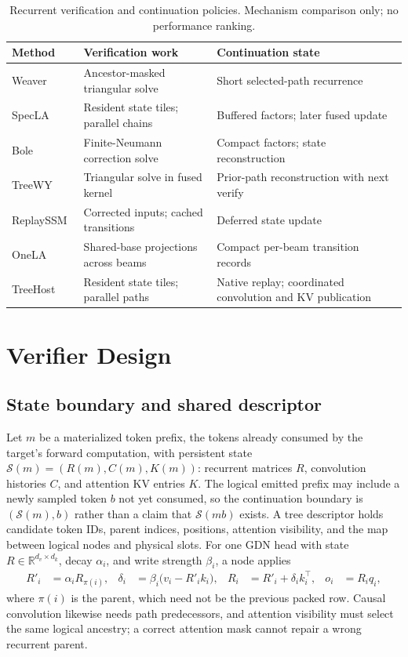 \documentclass[sigconf,anonymous,review]{acmart}
\newcommand{\sys}{TreeHost}
\begin{document}
\begin{table}[t]
\caption{Recurrent verification and continuation policies. Mechanism comparison only; no performance ranking.}
\label{tab:related}
\centering\footnotesize
\begin{tabularx}{\columnwidth}{@{}>{\raggedright\arraybackslash}p{}YY@{}}
\toprule
Method & Verification work & Continuation state \\
\midrule
Weaver~\cite{oda2026marginals} & Ancestor-masked triangular solve & Short selected-path recurrence \\
SpecLA~\cite{wang2026specla} & Resident state tiles; parallel chains & Buffered factors; later fused update \\
Bole~\cite{wang2026bole} & Finite-Neumann correction solve & Compact factors; state reconstruction \\
TreeWY~\cite{ghantasala2026treewycode} & Triangular solve in fused kernel & Prior-path reconstruction with next verify \\
ReplaySSM~\cite{replayssm2026} & Corrected inputs; cached transitions & Deferred state update \\
OneLA~\cite{yang2026onela} & Shared-base projections across beams & Compact per-beam transition records \\
\sys{} & Resident state tiles; parallel paths & Native replay; coordinated convolution and KV publication \\
\bottomrule
\end{tabularx}
\end{table}

\section{Verifier Design}
\label{sec:design}
\subsection{State boundary and shared descriptor}
Let $m$ be a materialized token prefix, the tokens already consumed by the target's forward computation, with persistent state $\mathcal{S}(m)=(R(m),C(m),K(m))$: recurrent matrices $R$, convolution histories $C$, and attention KV entries $K$. The logical emitted prefix may include a newly sampled token $b$ not yet consumed, so the continuation boundary is $(\mathcal{S}(m),b)$ rather than a claim that $\mathcal{S}(mb)$ exists. A tree descriptor holds candidate token IDs, parent indices, positions, attention visibility, and the map between logical nodes and physical slots. For one GDN head with state $R\in\mathbb{R}^{d_v\times d_k}$, decay $\alpha_i$, and write strength $\beta_i$, a node applies~\cite{yang2024gated}
\begin{align}
R'_i &= \alpha_i R_{\pi(i)}, & \delta_i &= \beta_i\bigl(v_i-R'_i k_i\bigr), & R_i &= R'_i+\delta_i k_i^\top, & o_i &= R_iq_i,
\end{align}
where $\pi(i)$ is the parent, which need not be the previous packed row. Causal convolution likewise needs path predecessors, and attention visibility must select the same logical ancestry; a correct attention mask cannot repair a wrong recurrent parent.
\end{document}
